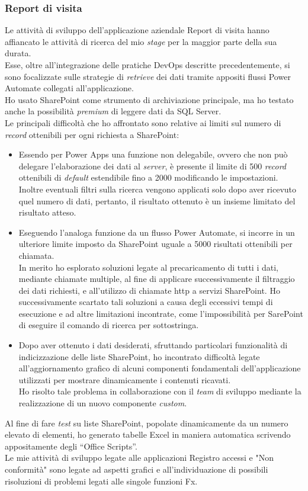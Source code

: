 \subsubsection*{Report di visita}
Le attività di sviluppo dell'applicazione aziendale Report di visita hanno affiancato le attività di ricerca del mio \emph{stage} per la maggior parte della sua durata.\\
Esse, oltre all'integrazione delle pratiche \gls{DevOps} descritte precedentemente, si sono focalizzate sulle strategie di \emph{retrieve} dei dati tramite appositi flussi Power Automate collegati all'applicazione.\\
Ho usato SharePoint come strumento di archiviazione principale, ma ho testato anche la possibilità \emph{premium} di leggere dati da SQL Server.\\
Le principali difficoltà che ho affrontato sono relative ai limiti sul numero di \emph{record} ottenibili per ogni richiesta a SharePoint:
\begin{itemize}
    \item Essendo per Power Apps una funzione non delegabile, ovvero che non può delegare l'elaborazione dei dati al \emph{server}, è presente il limite di 500 \emph{record} ottenibili di \emph{default} estendibile fino a 2000 modificando le impostazioni.
    Inoltre eventuali filtri sulla ricerca vengono applicati solo dopo aver ricevuto quel numero di dati, pertanto, il risultato ottenuto è un insieme limitato del risultato atteso.
    \item Eseguendo l'analoga funzione da un flusso Power Automate, si incorre in un ulteriore limite imposto da SharePoint uguale a 5000 risultati ottenibili per chiamata.\\
    In merito ho esplorato soluzioni legate al precaricamento di tutti i dati, mediante chiamate multiple, al fine di applicare successivamente il filtraggio dei dati richiesti, e all'utilizzo di chiamate \gls{http} a servizi SharePoint.
    Ho successivamente scartato tali soluzioni a causa degli eccessivi tempi di esecuzione e ad altre limitazioni incontrate, come l'impossibilità per SarePoint di eseguire il comando di ricerca per sottostringa.
    \item Dopo aver ottenuto i dati desiderati, sfruttando particolari funzionalità di indicizzazione delle liste SharePoint, ho incontrato difficoltà legate all'aggiornamento grafico di alcuni componenti fondamentali dell'applicazione utilizzati per mostrare dinamicamente i contenuti ricavati.\\
    Ho risolto tale problema in collaborazione con il \emph{team} di sviluppo mediante la realizzazione di un nuovo componente \emph{custom}.  
\end{itemize}
Al fine di fare \emph{test} su liste SharePoint, popolate dinamicamente da un numero elevato di elementi, ho generato tabelle Excel in maniera automatica scrivendo appositamente degli “Office Scripts”.\\
Le mie attività di sviluppo legate alle applicazioni Registro accessi e "Non conformità" sono legate ad aspetti grafici e all'individuazione di possibili risoluzioni di problemi legati alle singole funzioni Fx. 

